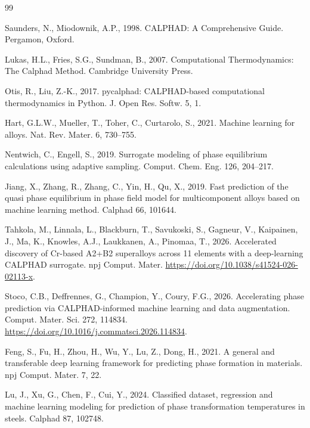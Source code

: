 \documentclass[preprint,12pt,authoryear]{elsarticle}
\begin{document}

\begin{thebibliography}{99}

Saunders, N., Miodownik, A.P., 1998. CALPHAD: A Comprehensive Guide. Pergamon,
Oxford.

Lukas, H.L., Fries, S.G., Sundman, B., 2007. Computational Thermodynamics: The
Calphad Method. Cambridge University Press.

Otis, R., Liu, Z.-K., 2017. pycalphad: CALPHAD-based computational
thermodynamics in Python. J. Open Res. Softw. 5, 1.

Hart, G.L.W., Mueller, T., Toher, C., Curtarolo, S., 2021. Machine learning for
alloys. Nat. Rev. Mater. 6, 730--755.

Nentwich, C., Engell, S., 2019. Surrogate modeling of phase equilibrium
calculations using adaptive sampling. Comput. Chem. Eng. 126, 204--217.

Jiang, X., Zhang, R., Zhang, C., Yin, H., Qu, X., 2019. Fast prediction of the
quasi phase equilibrium in phase field model for multicomponent alloys based
on machine learning method. Calphad 66, 101644.

Tahkola, M., Linnala, L., Blackburn, T., Savukoski, S., Gagneur, V.,
Kaipainen, J., Ma, K., Knowles, A.J., Laukkanen, A., Pinomaa, T., 2026.
Accelerated discovery of Cr-based A2+B2 superalloys across 11 elements with
a deep-learning CALPHAD surrogate. npj Comput. Mater.
\url{https://doi.org/10.1038/s41524-026-02113-x}.

Stoco, C.B., Deffrennes, G., Champion, Y., Coury, F.G., 2026.
Accelerating phase prediction via CALPHAD-informed machine learning and
data augmentation. Comput. Mater. Sci. 272, 114834.
\url{https://doi.org/10.1016/j.commatsci.2026.114834}.

Feng, S., Fu, H., Zhou, H., Wu, Y., Lu, Z., Dong, H., 2021. A general and
transferable deep learning framework for predicting phase formation in
materials. npj Comput. Mater. 7, 22.

Lu, J., Xu, G., Chen, F., Cui, Y., 2024. Classified dataset, regression and
machine learning modeling for prediction of phase transformation
temperatures in steels. Calphad 87, 102748.


\end{thebibliography}
\end{document}
